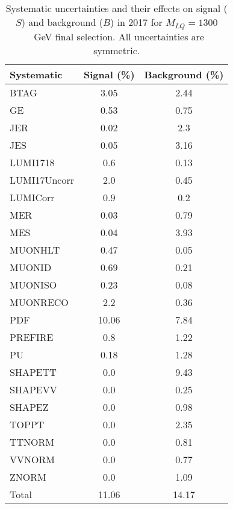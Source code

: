 \begin{table}[htbp]
\begin{center}
\caption{Systematic uncertainties and their effects on signal ($S$) and background ($B$) in 2017 for $M_{LQ}=1300$~GeV final selection. All uncertainties are symmetric.}
\begin{tabular}{lcc}
\hline\hline
Systematic & Signal (\%) & Background (\%) \\ \hline 
BTAG & 3.05 & 2.44\\ 
GE & 0.53 & 0.75\\ 
JER & 0.02 & 2.3\\ 
JES & 0.05 & 3.16\\ 
LUMI1718 & 0.6 & 0.13\\ 
LUMI17Uncorr & 2.0 & 0.45\\ 
LUMICorr & 0.9 & 0.2\\ 
MER & 0.03 & 0.79\\ 
MES & 0.04 & 3.93\\ 
MUONHLT & 0.47 & 0.05\\ 
MUONID & 0.69 & 0.21\\ 
MUONISO & 0.23 & 0.08\\ 
MUONRECO & 2.2 & 0.36\\ 
PDF & 10.06 & 7.84\\ 
PREFIRE & 0.8 & 1.22\\ 
PU & 0.18 & 1.28\\ 
SHAPETT & 0.0 & 9.43\\ 
SHAPEVV & 0.0 & 0.25\\ 
SHAPEZ & 0.0 & 0.98\\ 
TOPPT & 0.0 & 2.35\\ 
TTNORM & 0.0 & 0.81\\ 
VVNORM & 0.0 & 0.77\\ 
ZNORM & 0.0 & 1.09\\ 
Total & 11.06 & 14.17\\ \hline \hline
\end{tabular}
\label{tab:SysUncertainties_uujj_1300}
\end{center}
\end{table}

